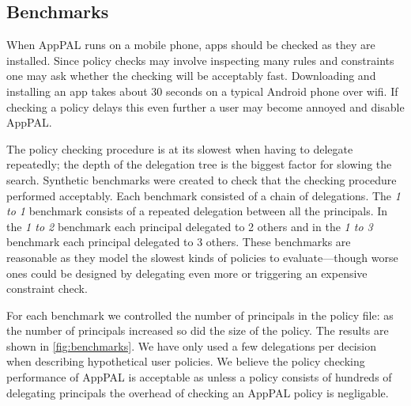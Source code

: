 \documentclass[]{llncs}
\begin{document}
\subsection{Benchmarks}
\label{ssec:benchmarks}

When AppPAL runs on a mobile phone, apps should be checked as they are installed.
Since policy checks may involve inspecting many rules and constraints one may ask whether the checking will be acceptably fast.
Downloading and installing an app takes about 30 seconds on a typical Android phone over wifi.
If checking a policy delays this even further a user may become annoyed and disable AppPAL.

The policy checking procedure is at its slowest when having to delegate repeatedly;
   the depth of the delegation tree is the biggest factor for slowing the search.
Synthetic benchmarks were created to check that the checking procedure performed acceptably.
Each benchmark consisted of a chain of delegations.
The \emph{1 to 1} benchmark consists of a repeated delegation between all the principals.
In the \emph{1 to 2} benchmark each principal delegated to 2 others and in the \emph{1 to 3} benchmark each principal delegated to 3 others.
These benchmarks are reasonable as they model the slowest kinds of policies to
evaluate---though worse ones could be designed by delegating even more or triggering an expensive constraint check.

For each benchmark we controlled the number of principals in the policy file:
  as the number of principals increased so did the size of the policy.
The results are shown in \autoref{fig:benchmarks}.
We have only used a few delegations per decision when describing hypothetical user policies.
We believe the policy checking performance of AppPAL is acceptable as unless a policy consists of hundreds of delegating principals the overhead of checking an AppPAL policy is negligable.
\end{document}

